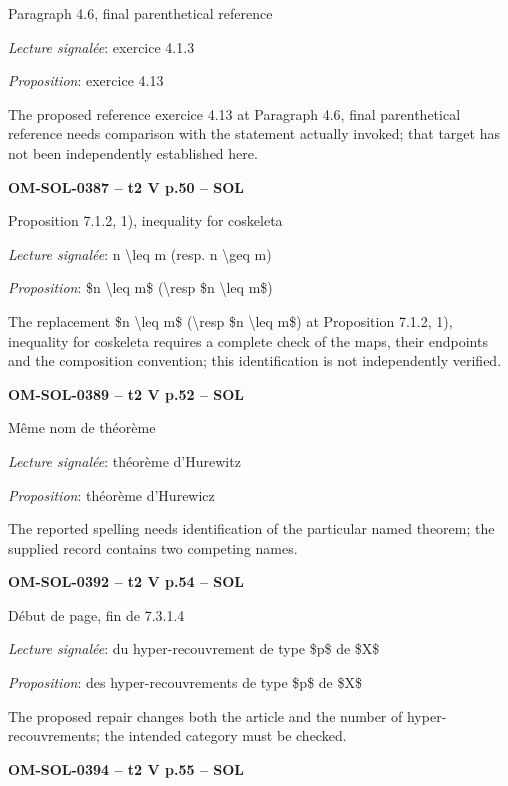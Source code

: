 Paragraph 4.6, final parenthetical reference\par
\emph{Lecture signalée}: exercice 4.1.3\par
\emph{Proposition}: exercice 4.13\par
The proposed reference exercice 4.13 at Paragraph 4.6, final parenthetical reference needs comparison with the statement actually invoked; that target has not been independently established here.\par
\par\noindent\textbf{OM-SOL-0387 -- t2 V p.50 -- SOL}\par
Proposition 7.1.2, 1), inequality for coskeleta\par
\emph{Lecture signalée}: n \textbackslash{}leq m (resp. n \textbackslash{}geq m)\par
\emph{Proposition}: \$n \textbackslash{}leq m\$ (\textbackslash{}resp \$n \textbackslash{}leq m\$)\par
The replacement \$n \textbackslash{}leq m\$ (\textbackslash{}resp \$n \textbackslash{}leq m\$) at Proposition 7.1.2, 1), inequality for coskeleta requires a complete check of the maps, their endpoints and the composition convention; this identification is not independently verified.\par
\par\noindent\textbf{OM-SOL-0389 -- t2 V p.52 -- SOL}\par
Même nom de théorème\par
\emph{Lecture signalée}: théorème d'Hurewitz\par
\emph{Proposition}: théorème d'Hurewicz\par
The reported spelling needs identification of the particular named theorem; the supplied record contains two competing names.\par
\par\noindent\textbf{OM-SOL-0392 -- t2 V p.54 -- SOL}\par
Début de page, fin de 7.3.1.4\par
\emph{Lecture signalée}: du hyper-recouvrement de type \$p\$ de \$X\$\par
\emph{Proposition}: des hyper-recouvrements de type \$p\$ de \$X\$\par
The proposed repair changes both the article and the number of hyper-recouvrements; the intended category must be checked.\par
\par\noindent\textbf{OM-SOL-0394 -- t2 V p.55 -- SOL}\par
